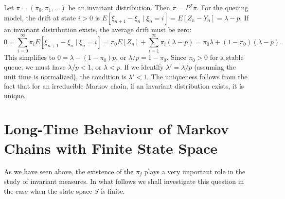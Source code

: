 \begin{Solution}
Let $\pi = (\pi_0, \pi_1, \dots)$ be an invariant distribution. Then $\pi = P^T \pi$.
For the queuing model, the drift at state $i > 0$ is $E[\xi_{n+1} - \xi_n \mid \xi_n = i] = E[Z_n - Y_n] = \lambda - p$.
If an invariant distribution exists, the average drift must be zero:
\[
0 = \sum_{i=0}^\infty \pi_i E[\xi_{n+1} - \xi_n \mid \xi_n = i] = \pi_0 E[Z_n] + \sum_{i=1}^\infty \pi_i (\lambda - p) = \pi_0 \lambda + (1 - \pi_0)(\lambda - p).
\]
This simplifies to $0 = \lambda - (1 - \pi_0) p$, or $\lambda/p = 1 - \pi_0$.
Since $\pi_0 > 0$ for a stable queue, we must have $\lambda/p < 1$, or $\lambda < p$.
If we identify $\lambda' = \lambda/p$ (assuming the unit time is normalized), the condition is $\lambda' < 1$.
The uniqueness follows from the fact that for an irreducible Markov chain, if an invariant distribution exists, it is unique.
\end{Solution}

\section{Long-Time Behaviour of Markov Chains with Finite State Space}

As we have seen above, the existence of the $\pi_j$ plays a very important role in the study of invariant measures. In what follows we shall investigate this question in the case when the state space $S$ is finite.

